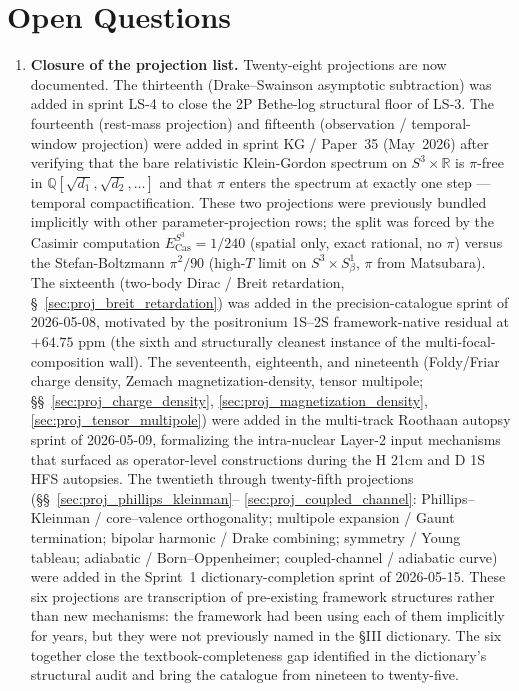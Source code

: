 \documentclass[11pt]{article}
\begin{document}
\section{Open Questions}
\label{sec:open}

\begin{enumerate}
\setlength\itemsep{0pt}

\item \textbf{Closure of the projection list.}  Twenty-eight projections
are now documented.  The thirteenth (Drake--Swainson asymptotic
subtraction) was added in sprint LS-4 to close the 2P Bethe-log
structural floor of LS-3.  The fourteenth (rest-mass projection) and
fifteenth (observation / temporal-window projection) were added in
sprint KG / Paper~35 (May~2026) after verifying that the bare
relativistic Klein-Gordon spectrum on $S^3 \times \mathbb{R}$ is
$\pi$-free in $\mathbb{Q}[\sqrt{d_1}, \sqrt{d_2}, \ldots]$ and that
$\pi$ enters the spectrum at exactly one step --- temporal
compactification.  These two projections were previously bundled
implicitly with other parameter-projection rows; the split was
forced by the Casimir computation $E_\text{Cas}^{S^3} = 1/240$
(spatial only, exact rational, no $\pi$) versus the Stefan-Boltzmann
$\pi^2/90$ (high-$T$ limit on $S^3 \times S^1_\beta$, $\pi$ from
Matsubara).  The sixteenth (two-body Dirac / Breit retardation,
\S~\ref{sec:proj_breit_retardation}) was added in the
precision-catalogue sprint of 2026-05-08, motivated by the
positronium 1S--2S framework-native residual at $+64.75$ ppm (the
sixth and structurally cleanest instance of the
multi-focal-composition wall).  The seventeenth, eighteenth, and
nineteenth (Foldy/Friar charge density, Zemach magnetization-density,
tensor multipole; \S\S~\ref{sec:proj_charge_density},
\ref{sec:proj_magnetization_density},
\ref{sec:proj_tensor_multipole}) were added in the multi-track
Roothaan autopsy sprint of 2026-05-09, formalizing the intra-nuclear
Layer-2 input mechanisms that surfaced as operator-level
constructions during the H 21cm and D 1S HFS autopsies.  The
twentieth through twenty-fifth projections
(\S\S~\ref{sec:proj_phillips_kleinman}--%
\ref{sec:proj_coupled_channel}: Phillips--Kleinman / core--valence
orthogonality; multipole expansion / Gaunt termination; bipolar
harmonic / Drake combining; symmetry / Young tableau; adiabatic /
Born--Oppenheimer; coupled-channel / adiabatic curve) were added in
the Sprint~1 dictionary-completion sprint of 2026-05-15.  These six
projections are transcription of pre-existing framework structures
rather than new mechanisms: the framework had been using each of them
implicitly for years, but they were not previously named in the §III
dictionary.  The six together close the textbook-completeness gap
identified in the dictionary's structural audit and bring the
catalogue from nineteen to twenty-five.


\end{enumerate}
\end{document}
